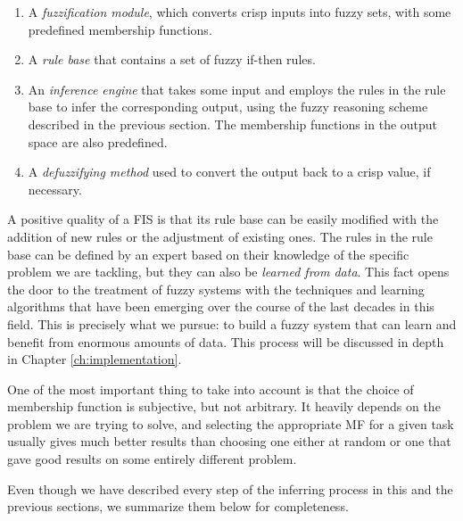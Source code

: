\begin{enumerate}[1.]
  \item A \textit{fuzzification module}, which converts crisp inputs into fuzzy sets, with some predefined membership functions.
  \item A \textit{rule base} that contains a set of fuzzy if-then rules.
  \item An \textit{inference engine} that takes some input and employs the rules in the rule base to infer the corresponding output, using the fuzzy reasoning scheme described in the previous section. The membership functions in the output space are also predefined.
  \item A \textit{defuzzifying method} used to convert the output back to a crisp value, if necessary.
\end{enumerate}

A positive quality of a FIS is that its rule base can be easily modified with the addition of new rules or the adjustment of existing ones. The rules in the rule base can be defined by an expert based on their knowledge of the specific problem we are tackling, but they can also be \textit{learned from data}. This fact opens the door to the treatment of fuzzy systems with the techniques and learning algorithms that have been emerging over the course of the last decades in this field. This is precisely what we pursue: to build a fuzzy system that can learn and benefit from enormous amounts of data. This process will be discussed in depth in Chapter \ref{ch:implementation}.

One of the most important thing to take into account is that the choice of membership function is subjective, but not arbitrary. It heavily depends on the problem we are trying to solve, and selecting the appropriate MF for a given task usually gives much better results than choosing one either at random or one that gave good results on some entirely different problem.

Even though we have described every step of the inferring process in this and the previous sections, we summarize them below for completeness.

